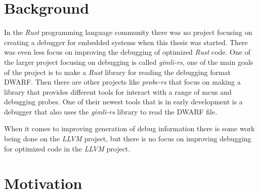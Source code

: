 \section{Background}
In the \emph{Rust} programming language community there was no project focusing on creating a debugger for embedded systems when this thesis was started.
There was even less focus on improving the debugging of optimized \emph{Rust} code.
One of the larger project focusing on debugging is called \emph{gimli-rs}, one of the main goals of the project is to make a \emph{Rust} library for reading the debugging format \gls{DWARF}.
Then there are other projects like \emph{probe-rs} that focus on making a library that provides different tools for interact with a range of \glspl{mcu} and debugging probes.
One of their newest tools that is in early development is a debugger that also uses the \emph{gimli-rs} library to read the \gls{DWARF} file.

When it comes to improving generation of debug information there is some work being done on the \emph{LLVM} project, but there is no focus on improving debugging for optimized code in the \emph{LLVM} project.


\section{Motivation}



